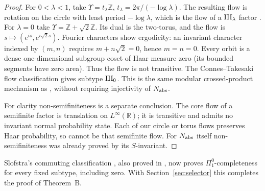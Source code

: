 \begin{proof}
For $0<\lambda<1$, take
$\Upsilon=t_\lambda\mathbb Z$, $t_\lambda=2\pi/(-\log\lambda)$.
The resulting flow is rotation on the circle with least period
$-\log\lambda$, which is the flow of a $\mathrm{III}_\lambda$ factor \cite{ConnesTakesaki}.
For $\lambda=0$ take $\Upsilon=\mathbb Z+\sqrt2\mathbb Z$.
Its dual is the two-torus, and the flow is
$s\mapsto(e^{is},e^{i\sqrt2s})$.
Fourier characters show ergodicity: an invariant character
indexed by $(m,n)$ requires $m+n\sqrt2=0$, hence $m=n=0$.
Every orbit is a dense one-dimensional subgroup coset of Haar
measure zero (its bounded segments have zero area).
Thus the flow is not transitive. The Connes--Takesaki flow
classification \cite{ConnesTakesaki} gives subtype $\mathrm{III}_0$.
This is the same modular crossed-product mechanism as
\cite[Example 3.9]{HM}, without requiring injectivity of $N_{\rm abs}$.

For clarity non-semifiniteness is a separate conclusion.
The core flow of a semifinite factor is translation on
$L^\infty(\mathbb R)$; it is transitive and admits no invariant
normal probability state. Each of our circle or torus flows
preserves Haar probability, so cannot be that semifinite flow.
For $N_{\rm abs}$ itself non-semifiniteness was already proved by its
$S$-invariant.
\end{proof}
Slofstra's commuting classification \cite{Slofstra}, also proved in \cite[Theorem 6.4]{MNY}, now proves
$\Pi^0_1$-completeness for every fixed subtype, including zero. With Section~\ref{sec:selector} this completes the proof of Theorem~B.
